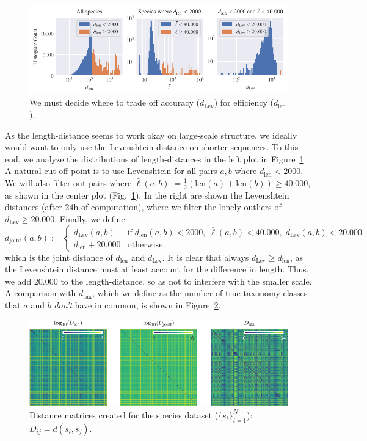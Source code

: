 \documentclass{article}
\begin{document}
\begin{figure}[htbp]
    \centering
    \includegraphics{hists.pdf}
    \vspace*{-8mm}
    \caption{We must decide where to trade off accuracy ($d_\mathrm{Lev}$) for efficiency ($d_\mathrm{len}$).}
    \label{fig:hists}
\end{figure}

As the length-distance seems to work okay on large-scale structure, we ideally would want to only use the Levenshtein distance on shorter sequences. To this end, we analyze the distributions of length-distances in the left plot in Figure~\ref{fig:hists}. A natural cut-off point is to use Levenshtein for all pairs $a, b$ where $d_\mathrm{len} < 2000$. We will also filter out pairs where $\bar \ell(a, b) := \frac{1}{2}(\mathrm{len}(a) + \mathrm{len}(b)) \geq 40.000$, as shown in the center plot (Fig.~\ref{fig:hists}). In the right are shown the Levenshtein distances (after 24h of computation), where we filter the lonely outliers of $d_\mathrm{Lev} \geq 20.000$. Finally, we define:
\begin{equation*}
    d_\mathrm{joint}(a, b) :=
    \begin{cases}
        d_\mathrm{Lev}(a, b) & \mathrm{if}\;d_\mathrm{len}(a, b) < 2000,\;\bar\ell(a, b) < 40.000,\;d_\mathrm{Lev}(a, b) < 20.000\\
        d_\mathrm{len} + 20.000 & \text{otherwise},
    \end{cases}
\end{equation*}
which is the joint distance of $d_\mathrm{len}$ and $d_\mathrm{Lev}$. It is clear that always $d_\mathrm{Lev} \geq d_\mathrm{len}$, as the Levenshtein distance must at least account for the difference in length. Thus, we add 20.000 to the length-distance, so as not to interfere with the smaller scale. A comparison with $d_\mathrm{tax}$, which we define as the number of true taxonomy classes that $a$ and $b$ \emph{don't} have in common, is shown in Figure~\ref{fig:dists}.

\begin{figure}[htbp]
    \centering
    \includegraphics{dist_matrices.pdf}
    \caption{Distance matrices created for the species dataset ($\{s_i\}_{i=1}^N$): $D_{ij} = d(s_i, s_j)$.}
    \label{fig:dists}
\end{figure}
\end{document}
